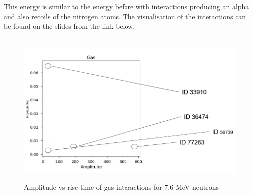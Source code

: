 \documentclass[a4paper]{article}
\begin{document}
\noindent This energy is similar to the energy before with interactions producing an alpha and also recoils of the nitrogen atoms. The visualisation of the interactions can be found on the slides from the link below.
\begin{figure}[H]-
        \centering
        \includegraphics[width=1\linewidth]{Fast/gas-id-8.PNG}
        \caption{Amplitude vs rise time of gas interactions for 7.6 MeV neutrons}
        \label{fig:south2d}
        \end{figure}
\end{document}
